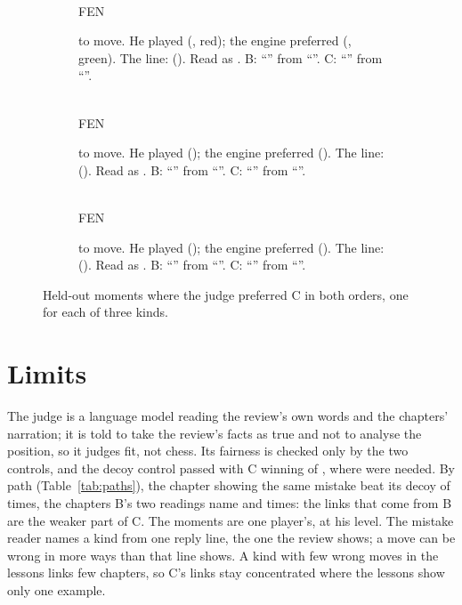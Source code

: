 \documentclass[11pt]{article}
\begin{document}
\begin{figure}[!ht]
\centering
\begin{subfigure}[t]{0.31\textwidth}
\centering
\EaBoard\\[0.4em]
{\footnotesize FEN \EaFen}
\caption{\EaSide{} to move. He played \EaPlayed{} (\EaPlayedUci, red); the engine preferred
\EaBest{} (\EaBestUci, green). The line: \EaLine{} (\EaLineUci). Read as \EaKind. B: ``\EaBChapter''
from ``\EaBLesson''. C: ``\EaCChapter'' from ``\EaCLesson''.}
\end{subfigure}\hfill
\begin{subfigure}[t]{0.31\textwidth}
\centering
\EbBoard\\[0.4em]
{\footnotesize FEN \EbFen}
\caption{\EbSide{} to move. He played \EbPlayed{} (\EbPlayedUci); the engine preferred \EbBest{}
(\EbBestUci). The line: \EbLine{} (\EbLineUci). Read as \EbKind. B: ``\EbBChapter'' from
``\EbBLesson''. C: ``\EbCChapter'' from ``\EbCLesson''.}
\end{subfigure}\hfill
\begin{subfigure}[t]{0.31\textwidth}
\centering
\EcBoard\\[0.4em]
{\footnotesize FEN \EcFen}
\caption{\EcSide{} to move. He played \EcPlayed{} (\EcPlayedUci); the engine preferred \EcBest{}
(\EcBestUci). The line: \EcLine{} (\EcLineUci). Read as \EcKind. B: ``\EcBChapter'' from
``\EcBLesson''. C: ``\EcCChapter'' from ``\EcCLesson''.}
\end{subfigure}
\caption{Held-out moments where the judge preferred C in both orders, one for each of three kinds.}
\label{fig:moments}
\end{figure}

\section{Limits}

The judge is a language model reading the review's own words and the chapters' narration; it is
told to take the review's facts as true and not to analyse the position, so it judges fit, not
chess. Its fairness is checked only by the two controls, and the decoy control passed with C
winning \DecoyWins{} of \DecoyJudged, where \DecoyBar{} were needed. By path
(Table~\ref{tab:paths}), the chapter showing the same mistake beat its decoy \PathMistakeWins{} of
\PathMistakeJudged{} times, the chapters B's two readings name \PathFixWins{} and
\PathReplyWins{} times: the links that come from B are the weaker part of C. The moments are one player's, at his
level. The mistake reader names a kind from one reply line, the one the review shows; a move can
be wrong in more ways than that line shows. A kind with few wrong moves in the lessons links few
chapters, so C's links stay concentrated where the lessons show only one example.
\end{document}
